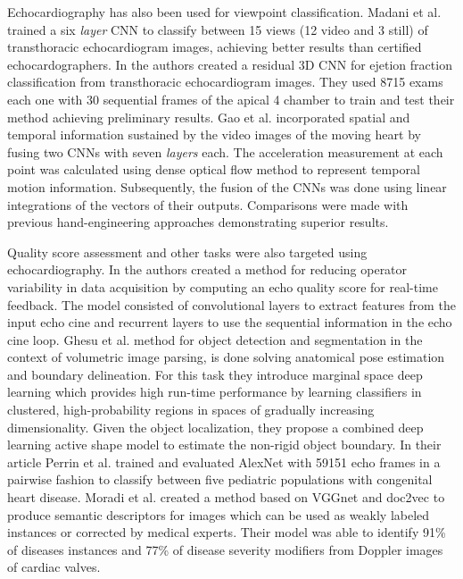\documentclass[journal]{IEEEtran}
\begin{document}
Echocardiography has also been used for viewpoint classification.
Madani et al.\cite{madani2018fast} trained a six \textit{layer} CNN to classify between 15 views (12 video and 3 still) of transthoracic echocardiogram images, achieving better results than certified echocardographers.
In\cite{silva2018ejection} the authors created a residual 3D CNN for ejetion fraction classification from transthoracic echocardiogram images.
They used 8715 exams each one with 30 sequential frames of the apical 4 chamber to train and test their method achieving preliminary results.
Gao et al.\cite{gao2017fused} incorporated spatial and temporal information sustained by the video images of the moving heart by fusing two CNNs with seven \textit{layers} each.
The acceleration measurement at each point was calculated using dense optical flow method to represent temporal motion information.
Subsequently, the fusion of the CNNs was done using linear integrations of the vectors of their outputs.
Comparisons were made with previous hand-engineering approaches demonstrating superior results.

Quality score assessment and other tasks were also targeted using echocardiography.
In\cite{abdi2017quality} the authors created a method for reducing operator variability in data acquisition by computing an echo quality score for real-time feedback.
The model consisted of convolutional layers to extract features from the input echo cine and recurrent layers to use the sequential information in the echo cine loop.
Ghesu et al.\cite{ghesu2016marginal} method for object detection and segmentation in the context of volumetric image parsing, is done solving anatomical pose estimation and boundary delineation.
For this task they introduce marginal space deep learning which provides high run-time performance by learning classifiers in clustered, high-probability regions in spaces of gradually increasing dimensionality.
Given the object localization, they propose a combined deep learning active shape model to estimate the non-rigid object boundary.
In their article Perrin et al.\cite{perrin2017application} trained and evaluated AlexNet with 59151 echo frames in a pairwise fashion to classify between five pediatric populations with congenital heart disease.
Moradi et al.\cite{moradi2016cross} created a method based on VGGnet and doc2vec\cite{le2014distributed} to produce semantic descriptors for images which can be used as weakly labeled instances or corrected by medical experts.
Their model was able to identify 91\% of diseases instances and 77\% of disease severity modifiers from Doppler images of cardiac valves.
\end{document}
